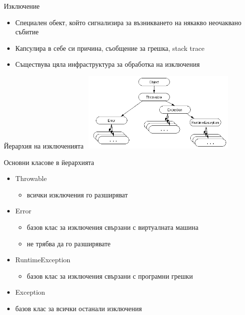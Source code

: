 \documentclass{beamer}
\begin{document}
\begin{frame}{Изключение}
  \transdissolve
  \begin{itemize}
  \item Специален обект, който сигнализира за възникването на някакво
    неочаквано събитие
  \item Капсулира в себе си причина, съобщение за грешка, stack trace
  \item Съществува цяла инфраструктура за обработка на изключения
  \end{itemize}
\end{frame}


\begin{frame}{Йерархия на изключенията}
  \transdissolve
  \includegraphics[height=150px,width=300px]{images/throwableHierarchy}
\end{frame}

\begin{frame}{Основни класове в йерархията}
  \transdissolve
  \begin{itemize}
  \item Throwable
    \begin{itemize}
    \item всички изключения го разширяват
    \end{itemize}
  \item Error
    \begin{itemize}
      \item базов клас за изключения свързани с виртуалната машина
      \item не трябва да го разширявате
    \end{itemize}
  \item RuntimeException
    \begin{itemize}
      \item базов клас за изключения свързани с програмни грешки
    \end{itemize}
  \item Exception
    \item базов клас за всички останали изключения
  \end{itemize}
\end{frame}
\end{document}
